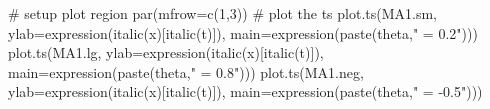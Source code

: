 \begin{Schunk}
\begin{Sinput}
 # setup plot region
 par(mfrow=c(1,3))
 # plot the ts
 plot.ts(MA1.sm,
         ylab=expression(italic(x)[italic(t)]),
         main=expression(paste(theta," = 0.2")))
 plot.ts(MA1.lg,
         ylab=expression(italic(x)[italic(t)]),
         main=expression(paste(theta," = 0.8")))
 plot.ts(MA1.neg,
         ylab=expression(italic(x)[italic(t)]),
         main=expression(paste(theta," = -0.5")))
\end{Sinput}
\end{Schunk}

